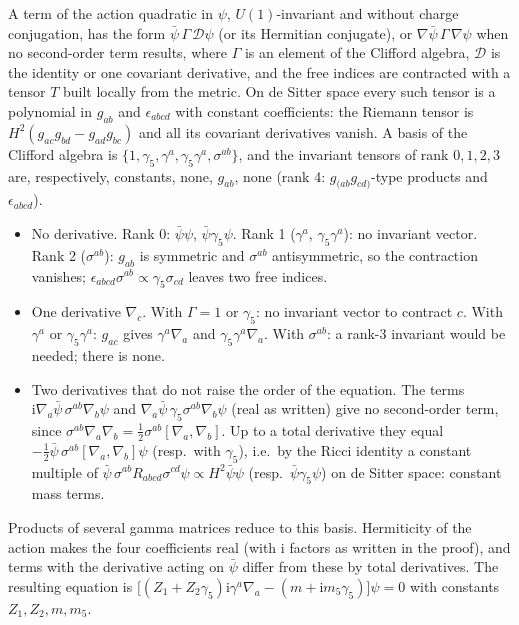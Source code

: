 \documentclass[11pt,a4paper]{article}
\theoremstyle{definition}
\newcommand{\ii}{\mathrm{i}}
\begin{document}
A term of the action quadratic in $\psi$, $U(1)$-invariant and without charge conjugation, has the form $\bar\psi\,\Gamma\,\mathcal{D}\psi$ (or its Hermitian conjugate), or $\nabla\bar\psi\,\Gamma\,\nabla\psi$ when no second-order term results, where $\Gamma$ is an element of the Clifford algebra, $\mathcal{D}$ is the identity or one covariant derivative, and the free indices are contracted with a tensor $T$ built locally from the metric. On de Sitter space every such tensor is a polynomial in $g_{ab}$ and $\epsilon_{abcd}$ with constant coefficients: the Riemann tensor is $H^{2}(g_{ac}g_{bd}-g_{ad}g_{bc})$ and all its covariant derivatives vanish. A basis of the Clifford algebra is $\{1,\gamma_{5},\gamma^{a},\gamma_{5}\gamma^{a},\sigma^{ab}\}$, and the invariant tensors of rank $0,1,2,3$ are, respectively, constants, none, $g_{ab}$, none (rank 4: $g_{(ab}g_{cd)}$-type products and $\epsilon_{abcd}$).
\begin{itemize}[leftmargin=1.5em]
\item No derivative. Rank 0: $\bar\psi\psi$, $\bar\psi\gamma_{5}\psi$. Rank 1 ($\gamma^{a}$, $\gamma_{5}\gamma^{a}$): no invariant vector. Rank 2 ($\sigma^{ab}$): $g_{ab}$ is symmetric and $\sigma^{ab}$ antisymmetric, so the contraction vanishes; $\epsilon_{abcd}\sigma^{ab}\propto\gamma_{5}\sigma_{cd}$ leaves two free indices.
\item One derivative $\nabla_{c}$. With $\Gamma=1$ or $\gamma_{5}$: no invariant vector to contract $c$. With $\gamma^{a}$ or $\gamma_{5}\gamma^{a}$: $g_{ac}$ gives $\gamma^{a}\nabla_{a}$ and $\gamma_{5}\gamma^{a}\nabla_{a}$. With $\sigma^{ab}$: a rank-3 invariant would be needed; there is none.
\item Two derivatives that do not raise the order of the equation. The terms $\ii\nabla_{a}\bar\psi\,\sigma^{ab}\nabla_{b}\psi$ and $\nabla_{a}\bar\psi\,\gamma_{5}\sigma^{ab}\nabla_{b}\psi$ (real as written) give no second-order term, since $\sigma^{ab}\nabla_{a}\nabla_{b}=\tfrac12\sigma^{ab}[\nabla_{a},\nabla_{b}]$. Up to a total derivative they equal $-\tfrac12\bar\psi\,\sigma^{ab}[\nabla_{a},\nabla_{b}]\psi$ (resp.\ with $\gamma_{5}$), i.e.\ by the Ricci identity a constant multiple of $\bar\psi\,\sigma^{ab}R_{abcd}\sigma^{cd}\psi\propto H^{2}\bar\psi\psi$ (resp.\ $\bar\psi\gamma_{5}\psi$) on de Sitter space: constant mass terms.
\end{itemize}
Products of several gamma matrices reduce to this basis. Hermiticity of the action makes the four coefficients real (with $\ii$ factors as written in the proof), and terms with the derivative acting on $\bar\psi$ differ from these by total derivatives. The resulting equation is $\big[(Z_{1}+Z_{2}\gamma_{5})\ii\gamma^{a}\nabla_{a}-(m+\ii m_{5}\gamma_{5})\big]\psi=0$ with constants $Z_{1},Z_{2},m,m_{5}$.
\end{document}

